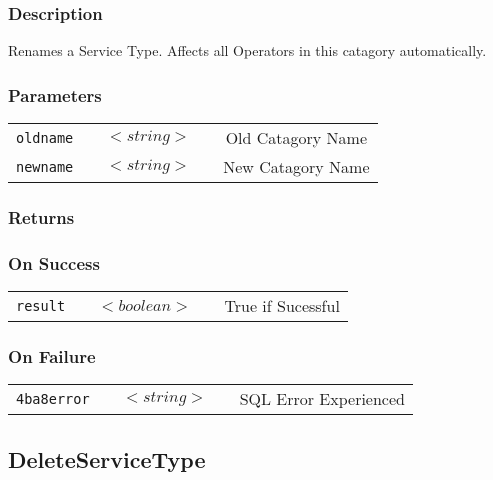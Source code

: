 \documentclass[a4paper,12pt]{article}
\begin{document}
\subsubsection{Description}

Renames a Service Type. Affects all Operators in this catagory
automatically. 

\subsubsection{Parameters}

\begin{tabular}{ccccc}
\verb!oldname! & \vspace{15mm} & $<string>$ & \vspace{15mm} & Old Catagory Name \\
\verb!newname! & \vspace{15mm} & $<string>$ & \vspace{15mm} & New Catagory Name \\
\end{tabular}

\subsubsection{Returns}

\subsubsection{On Success}

\begin{tabular}{ccccc}
\verb!result! & \vspace{15mm} & $<boolean>$ & \vspace{15mm} & True if Sucessful \\
\end{tabular}

\subsubsection{On Failure}

\begin{tabular}{ccccc}
\verb!4ba8error! & \vspace{15mm} & $<string>$ & \vspace{15mm} & SQL Error Experienced \\
\end{tabular}


\subsection{DeleteServiceType}
\end{document}
